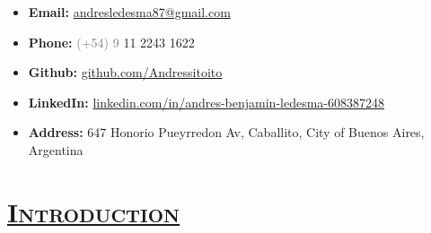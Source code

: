 \documentclass{resume} %
\begin{document}

\vspace{-0.8cm}
\begin{itemize}
  \setlength\itemsep{-7px}
  \item \textbf{Email:} \href{mailto:andresledesma87@gmail.com }{andresledesma87@gmail.com }
  \item \textbf{Phone:} \textcolor{gray}{(+54) 9} 11 2243 1622
  \item \textbf{Github:} \href{https://github.com/Andressitoito}{github.com/Andressitoito}
  \item \textbf{LinkedIn:} \href{https://www.linkedin.com/in/andres-benjamin-ledesma-608387248/}{linkedin.com/in/andres-benjamin-ledesma-608387248}
  \item \textbf{Address:} 647 Honorio Pueyrredon Av, Caballito, City of Buenos Aires, Argentina
\end{itemize}

\section*{\textsc{\underline{Introduction}}}
\end{document}
